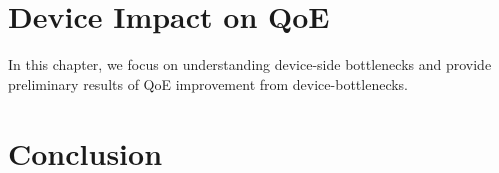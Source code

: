\documentclass[12pt]{cmuthesis}
\begin{document}
\chapter{Device Impact on QoE}
In this chapter, we focus on understanding device-side bottlenecks and provide preliminary results of QoE improvement from device-bottlenecks.








\chapter{Conclusion}


\backmatter

\renewcommand{\bibsection}{\chapter{\bibname}}

\end{document}
